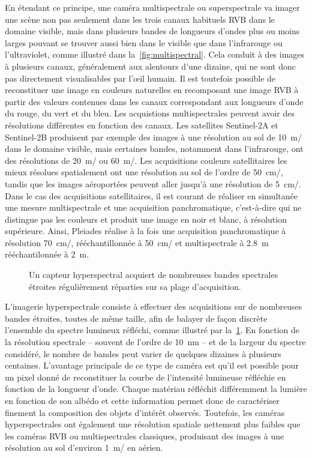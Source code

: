 En étendant ce principe, une caméra multispectrale ou superspectrale va imager une scène non pas seulement dans les trois canaux habituels \gls{RVB} dans le domaine visible, mais dans plusieurs bandes de longueurs d'ondes plus ou moins larges pouvant se trouver aussi bien dans le visible que dans l'infrarouge ou l'ultraviolet, comme illustré dans la~\cref{fig:multispectral}. Cela conduit à des images à plusieurs canaux, généralement aux alentours d'une dizaine, qui ne sont donc pas directement visualisables par l'\oe{}il humain. Il est toutefois possible de reconstituer une image en couleurs naturelles en recomposant une image \gls{RVB} à partir des valeurs contenues dans les canaux correspondant aux longueurs d'onde du rouge, du vert et du bleu. Les acquistions multispectrales peuvent avoir des résolutions différentes en fonction des canaux. Les satellites Sentinel-2A et Sentinel-2B produisent par exemple des images à une résolution au sol de \SI{10}{\meter/\px} dans le domaine visible, mais certaines bandes, notamment dans l'infrarouge, ont des résolutions de \SI{20}{\meter/\px} ou \SI{60}{\meter/\px}. Les acquisitions couleurs satellitaires les mieux résolues spatialement ont une résolution au sol de l'ordre de \SI{50}{\centi\meter/\px}, tandis que les images aéroportées peuvent aller jusqu'à une résolution de \SI{5}{\centi\meter/\px}. Dans le cas des acquisitions satellitaires, il est courant de réaliser en simultanée une mesure multispectrale et une acquisition panchromatique, c'est-à-dire qui ne distingue pas les couleurs et produit une image en noir et blanc, à résolution supérieure. Ainsi, \gls{Pleiades} réalise à la fois une acquisition panchromatique à résolution \SI{70}{\centi\meter/\px}, rééchantillonnée à \SI{50}{\centi\meter/\px} et multispectrale à \SI{2,8}{\meter} rééchantilonnée à \SI{2}{\meter}.

\begin{figure}
  \resizebox{\textwidth}{!}{
  
  }
  \caption{Un capteur hyperspectral acquiert de nombreuses bandes spectrales étroites régulièrement réparties sur sa plage d'acquisition.}
  \label{fig:hyperspectral}
\end{figure}

L'imagerie hyperspectrale consiste à effectuer des acquisitions sur de nombreuses bandes étroites, toutes de même taille, afin de balayer de façon discrète l'ensemble du spectre lumineux réfléchi, comme illustré par la~\cref{fig:hyperspectral}. En fonction de la résolution spectrale -- souvent de l'ordre de \SI{10}{\nano\meter} -- et de la largeur du spectre considéré, le nombre de bandes peut varier de quelques dizaines à plusieurs centaines. L'avantage principale de ce type de caméra est qu'il est possible pour un pixel donné de reconstituer la courbe de l'intensité lumineuse réfléchie en fonction de la longueur d'onde. Chaque matériau réfléchit différemment la lumière en fonction de son albédo et cette information permet donc de caractériser finement la composition des objets d'intérêt observés. Toutefois, les caméras hyperspectrales ont également une résolution spatiale nettement plus faibles que les caméras \gls{RVB} ou multispectrales classiques, produisant des images à une résolution au sol d'environ \SI{1}{\meter/\px} en aérien.

